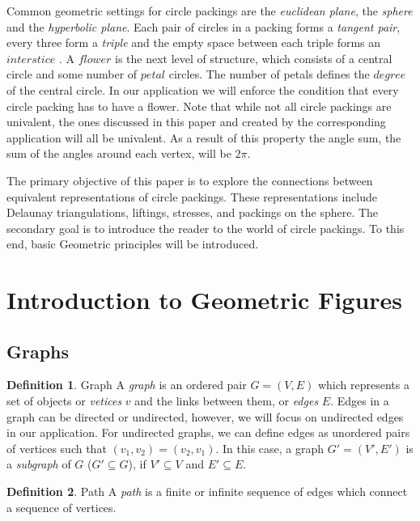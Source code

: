 \documentclass[11pt]{article}
\theoremstyle{definition}
\newtheorem{definition}{Definition}[section]
\begin{document}
Common geometric settings for circle packings are the \emph{euclidean plane}, the \emph{sphere} and the \emph{hyperbolic plane}. Each pair of circles in a packing forms a \emph{tangent pair}, every three form a \emph{triple} and the empty space between each triple forms an $interstice$ \cite{stephenson05introduction}. A $flower$ is the next level of structure, which consists of a central circle and some number of $petal$ circles. The number of petals defines the $degree$ of the central circle. In our application we will enforce the condition that every circle packing has to have a flower. Note that while not all circle packings are univalent, the ones discussed in this paper and created by the corresponding application will all be univalent. As a result of this property the angle sum, the sum of the angles around each vertex, will be $2\pi$.

The primary objective of this paper is to explore the connections between equivalent representations of circle packings. These representations include Delaunay triangulations, liftings, stresses, and packings on the sphere. The secondary goal is to introduce the reader to the world of circle packings. To this end, basic Geometric principles will be introduced.

\section{Introduction to Geometric Figures}
\subsection{Graphs}
	\theoremstyle{definition}
	\begin{definition}{Graph}
		A \emph{graph} is an ordered pair $G=(V,E)$ which represents a set of objects or \emph{vetices} $v$ and the links between them, or \emph{edges} $E$. 
		Edges in a graph can be directed or undirected, however, we will focus on undirected edges in our application. 
		For undirected graphs, we can define edges as unordered pairs of vertices such that $(v_1, v_2) = (v_2, v_1)$. 
		In this case, a graph $G' = (V',E')$ is a \emph{subgraph} of $G$ ($G' \subseteq G$), if $V' \subseteq V$ and $E' \subseteq E$.
	\end{definition}
	
	\theoremstyle{definition}
	\begin{definition}{Path}
		A \emph{path} is a finite or infinite sequence of edges which connect a sequence of vertices.
	\end{definition}
	
\end{document}
